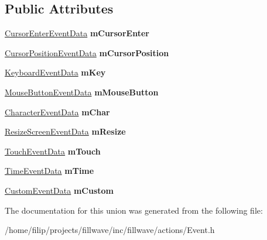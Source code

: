 \subsection*{Public Attributes}
\begin{DoxyCompactItemize}
\item 
\mbox{\label{unionflw_1_1flf_1_1EventData_a23560c72826b4d38905c60c03251ffbe}} 
\hyperlink{structflw_1_1flf_1_1CursorEnterEventData}{Cursor\+Enter\+Event\+Data} {\bfseries m\+Cursor\+Enter}
\item 
\mbox{\label{unionflw_1_1flf_1_1EventData_a12410d26b686a54f46afb2270224932c}} 
\hyperlink{structflw_1_1flf_1_1CursorPositionEventData}{Cursor\+Position\+Event\+Data} {\bfseries m\+Cursor\+Position}
\item 
\mbox{\label{unionflw_1_1flf_1_1EventData_abf868659691673cf6a5f78babfd74d09}} 
\hyperlink{structflw_1_1flf_1_1KeyboardEventData}{Keyboard\+Event\+Data} {\bfseries m\+Key}
\item 
\mbox{\label{unionflw_1_1flf_1_1EventData_ae6845fbf2e0bb39f05443d1f49a4b83c}} 
\hyperlink{structflw_1_1flf_1_1MouseButtonEventData}{Mouse\+Button\+Event\+Data} {\bfseries m\+Mouse\+Button}
\item 
\mbox{\label{unionflw_1_1flf_1_1EventData_abbbc57db59dfa217ba5a983fdf96ddc3}} 
\hyperlink{structflw_1_1flf_1_1CharacterEventData}{Character\+Event\+Data} {\bfseries m\+Char}
\item 
\mbox{\label{unionflw_1_1flf_1_1EventData_a47c4fb3ee0c48827e2abeb60389588fa}} 
\hyperlink{structflw_1_1flf_1_1ResizeScreenEventData}{Resize\+Screen\+Event\+Data} {\bfseries m\+Resize}
\item 
\mbox{\label{unionflw_1_1flf_1_1EventData_a7bc64cc0caa4b2b0534de642bb87122f}} 
\hyperlink{structflw_1_1flf_1_1TouchEventData}{Touch\+Event\+Data} {\bfseries m\+Touch}
\item 
\mbox{\label{unionflw_1_1flf_1_1EventData_ae7197b01985a42572ed100e6e8ce84d5}} 
\hyperlink{structflw_1_1flf_1_1TimeEventData}{Time\+Event\+Data} {\bfseries m\+Time}
\item 
\mbox{\label{unionflw_1_1flf_1_1EventData_abe7d65881a2145d92d20e81454ae9a18}} 
\hyperlink{unionflw_1_1flf_1_1CustomEventData}{Custom\+Event\+Data} {\bfseries m\+Custom}
\end{DoxyCompactItemize}


The documentation for this union was generated from the following file\+:\begin{DoxyCompactItemize}
\item 
/home/filip/projects/fillwave/inc/fillwave/actions/Event.\+h\end{DoxyCompactItemize}
